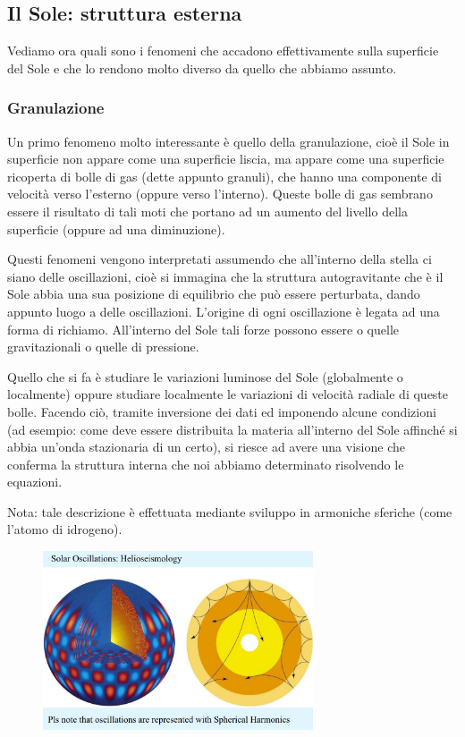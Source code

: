 \subsection{Il Sole: struttura esterna}
Vediamo ora quali sono i fenomeni che accadono effettivamente sulla superficie del Sole e che lo rendono molto diverso da quello che abbiamo assunto.
\subsubsection{Granulazione}
Un primo fenomeno molto interessante è quello della granulazione, cioè il Sole in superficie non appare come una superficie liscia, ma appare come una superficie ricoperta di bolle di gas (dette appunto granuli), che hanno una componente di velocità verso l'esterno (oppure verso l'interno). Queste bolle di gas sembrano essere il risultato di tali moti che portano ad un aumento del livello della superficie (oppure ad una diminuzione).

Questi fenomeni vengono interpretati assumendo che all'interno della stella ci siano delle oscillazioni, cioè si immagina che la struttura autogravitante che è il Sole abbia una sua posizione di equilibrio che può essere perturbata, dando appunto luogo a delle oscillazioni. L'origine di ogni oscillazione è legata ad una forma di richiamo. All'interno del Sole tali forze possono essere o quelle gravitazionali o quelle di pressione.

Quello che si fa è studiare le variazioni luminose del Sole (globalmente o localmente) oppure studiare localmente le variazioni di velocità radiale di queste bolle. Facendo ciò, tramite inversione dei dati ed imponendo alcune condizioni (ad esempio: come deve essere distribuita la materia all'interno del Sole affinché si abbia un'onda stazionaria di un certo), si riesce ad avere una visione che conferma la struttura interna che noi abbiamo determinato risolvendo le equazioni.

Nota: tale descrizione è effettuata mediante sviluppo in armoniche sferiche (come l'atomo di idrogeno).

\begin{figure}[H]
    \centering
    \includegraphics[width=8cm]{2dic/Eliosismologia.jpg}
    \label{fig:Eliosism}
\end{figure}

